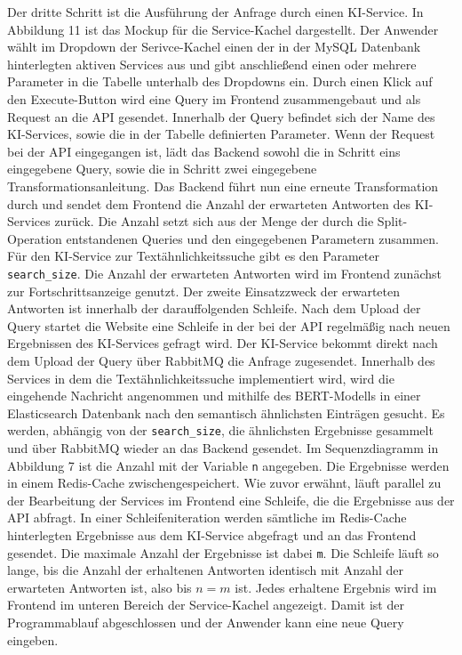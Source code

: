 Der dritte Schritt ist die Ausführung der Anfrage durch einen KI-Service. In Abbildung 11 ist das Mockup für die Service-Kachel dargestellt. Der Anwender  wählt im Dropdown der Serivce-Kachel einen der in der MySQL Datenbank hinterlegten aktiven Services aus und gibt anschließend einen oder mehrere Parameter in die Tabelle unterhalb des Dropdowns ein. Durch einen Klick auf den Execute-Button wird eine Query im Frontend zusammengebaut und als Request an die API gesendet. Innerhalb der Query befindet sich der Name des KI-Services, sowie die in der Tabelle definierten Parameter. Wenn der Request bei der API eingegangen ist, lädt das Backend sowohl die in Schritt eins eingegebene Query, sowie die in Schritt zwei eingegebene Transformationsanleitung. Das Backend führt nun eine erneute Transformation durch und sendet dem Frontend die Anzahl der erwarteten Antworten des KI-Services zurück. Die Anzahl setzt sich aus der Menge der durch die Split-Operation entstandenen Queries und den eingegebenen Parametern zusammen. Für den KI-Service zur Textähnlichkeitssuche gibt es den Parameter \texttt{search\_{}size}. Die Anzahl der erwarteten Antworten wird im Frontend zunächst zur Fortschrittsanzeige genutzt. Der zweite Einsatzzweck der erwarteten Antworten ist innerhalb der darauffolgenden Schleife. Nach dem Upload der Query startet die Website eine Schleife in der bei der API regelmäßig nach neuen Ergebnissen des KI-Services gefragt wird. Der KI-Service bekommt direkt nach dem Upload der Query über RabbitMQ die Anfrage zugesendet. Innerhalb des Services in dem die Textähnlichkeitssuche  implementiert wird, wird die eingehende Nachricht angenommen und mithilfe des BERT-Modells in einer Elasticsearch Datenbank nach den semantisch ähnlichsten Einträgen gesucht. Es werden, abhängig von der \texttt{search\_{}size}, die ähnlichsten Ergebnisse gesammelt und über RabbitMQ wieder an das Backend gesendet. Im Sequenzdiagramm in Abbildung 7 ist die Anzahl mit der Variable \texttt{n} angegeben. Die Ergebnisse werden in einem Redis-Cache zwischengespeichert. Wie zuvor erwähnt, läuft parallel zu der Bearbeitung der Services im Frontend eine Schleife, die die Ergebnisse aus der API abfragt. In einer Schleifeniteration werden sämtliche im Redis-Cache hinterlegten Ergebnisse aus dem KI-Service abgefragt und an das Frontend gesendet. Die maximale Anzahl der Ergebnisse ist dabei \texttt{m}. Die Schleife läuft so lange, bis die Anzahl der erhaltenen Antworten identisch mit Anzahl der erwarteten Antworten ist, also bis $n=m$ ist. Jedes erhaltene Ergebnis wird im Frontend im unteren Bereich der Service-Kachel angezeigt. Damit ist der Programmablauf abgeschlossen und der Anwender kann eine neue Query eingeben.

